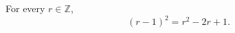 \documentclass{article}
\begin{document}
\begin{theorem}\label{hold:revision}
For every $r\in\mathbb{Z}$,
\[(r-1)^2=r^2-2r+1.\]
\end{theorem}
\end{document}
